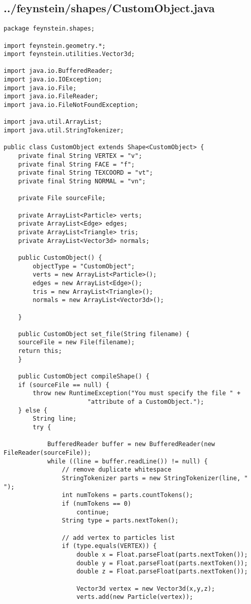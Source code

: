 \subsection*{../feynstein/shapes/CustomObject.java}
\begin{lstlisting}
package feynstein.shapes;

import feynstein.geometry.*;
import feynstein.utilities.Vector3d;

import java.io.BufferedReader;
import java.io.IOException;
import java.io.File;
import java.io.FileReader;
import java.io.FileNotFoundException;

import java.util.ArrayList;
import java.util.StringTokenizer;

public class CustomObject extends Shape<CustomObject> {
	private final String VERTEX = "v";
	private final String FACE = "f";
	private final String TEXCOORD = "vt";
	private final String NORMAL = "vn";
	
	private File sourceFile;

	private ArrayList<Particle> verts;
	private ArrayList<Edge> edges;
	private ArrayList<Triangle> tris;
	private ArrayList<Vector3d> normals;

    public CustomObject() {
		objectType = "CustomObject";
		verts = new ArrayList<Particle>();
		edges = new ArrayList<Edge>();
		tris = new ArrayList<Triangle>();
		normals = new ArrayList<Vector3d>();
		
    }
    
    public CustomObject set_file(String filename) {
	sourceFile = new File(filename);
	return this;
    }

    public CustomObject compileShape() {
	if (sourceFile == null) {
	    throw new RuntimeException("You must specify the file " +
				       "attribute of a CustomObject.");
	} else {
		String line;
		try {
			
			BufferedReader buffer = new BufferedReader(new FileReader(sourceFile));
			while ((line = buffer.readLine()) != null) {
				// remove duplicate whitespace
				StringTokenizer parts = new StringTokenizer(line, " ");
				int numTokens = parts.countTokens();
				if (numTokens == 0)
					continue;
				String type = parts.nextToken();
				
				// add vertex to particles list
				if (type.equals(VERTEX)) {
					double x = Float.parseFloat(parts.nextToken());
					double y = Float.parseFloat(parts.nextToken());
					double z = Float.parseFloat(parts.nextToken());
					
					Vector3d vertex = new Vector3d(x,y,z);
					verts.add(new Particle(vertex));
					

\end{lstlisting}
